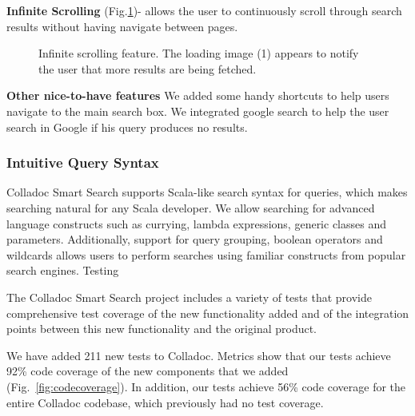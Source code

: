 \textbf{Infinite Scrolling} (Fig.\ref{fig:infinityscrolling})- allows the user to continuously scroll through search results without having navigate between pages.


\begin{figure}[h!t]
\begin{center}
\leavevmode
{}
\end{center}
\caption{Infinite scrolling feature. The loading image (1) appears to notify the user that more results are being fetched.}
\label{fig:infinityscrolling}
\end{figure}

\textbf{Other nice-to-have features} 
We added some handy shortcuts to help users navigate to the main search box. We integrated google search to help the user search in Google if his query produces no results. 

\subsubsection{Intuitive Query Syntax}
Colladoc Smart Search supports Scala-like search syntax for queries, which makes searching natural for any Scala developer. We allow searching for advanced language constructs such as currying, lambda expressions, generic classes and parameters. Additionally, support for query grouping, boolean operators and wildcards allows users to perform searches using familiar constructs from popular search engines.   
Testing

The Colladoc Smart Search project includes a variety of tests that provide comprehensive test coverage of the new functionality added and of the integration points between this new functionality and the original product.

We have added 211 new tests to Colladoc. Metrics show that our tests achieve 92\% code coverage of the new components that we added (Fig.~\ref{fig:codecoverage}). In addition, our tests achieve 56\% code coverage for the entire Colladoc codebase, which previously had no test coverage.


